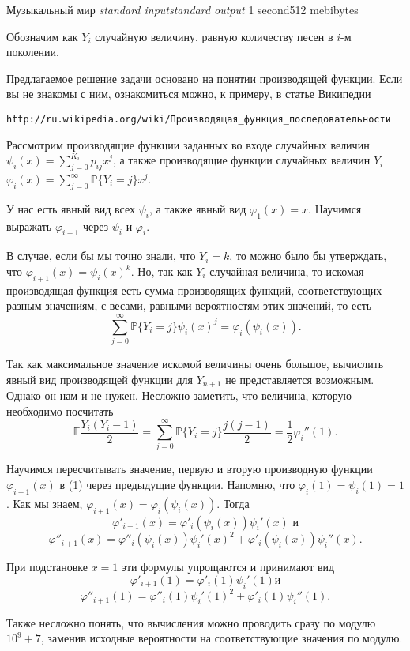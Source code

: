 \begin{problem}{Музыкальный мир}
{\textsl{standard input}}{\textsl{standard output}}
{1 second}{512 mebibytes}{}

Обозначим как $Y_i$ случайную величину,
равную количеству песен в $i$-м поколении.

Предлагаемое решение задачи основано на понятии производящей функции.
Если вы не знакомы с ним, ознакомиться можно, к примеру, в статье Википедии

\verb+http://ru.wikipedia.org/wiki/Производящая_функция_последовательности+

Рассмотрим производящие функции заданных во входе случайных величин
$\psi_i(x) = \sum\limits_{j=0}^{K_i}{p_{ij}x^j}$,
а также производящие функции случайных величин $Y_i$
$\varphi_i(x) = \sum\limits_{j=0}^{\infty}{\mathbb{P}\{Y_i=j\}x^j}$.

У нас есть явный вид всех $\psi_i$, а также явный вид $\varphi_1(x) = x$.
Научимся выражать $\varphi_{i+1}$ через $\psi_{i}$ и $\varphi_{i}$.

В случае, если бы мы точно знали, что $Y_i = k$,
то можно было бы утверждать, что $\varphi_{i+1}(x) = \psi_i(x)^k$.
Но, так как $Y_i$ случайная величина, то искомая производящая функция
есть сумма производящих функций, соответствующих разным значениям,
с весами, равными вероятностям этих значений, то есть
$$\sum\limits_{j=0}^{\infty}{\mathbb{P}\{Y_i=j\}\psi_i(x)^j} =
\varphi_i(\psi_i(x))\text{.}$$

Так как максимальное значение искомой величины очень большое,
вычислить явный вид производящей функции для $Y_{n+1}$
не представляется возможным. 
Однако он нам и не нужен.
Несложно заметить, что величина, которую необходимо посчитать
$$\mathbb{E}\frac{Y_i(Y_i-1)}{2} =
\sum\limits_{j=0}^{\infty}{\mathbb{P}\{Y_i=j\}\frac{j(j-1)}{2}} =
\frac{1}{2}\varphi_i''(1)\text{.}$$

Научимся пересчитывать значение, первую и вторую производную функции
$\varphi_{i+1}(x)$ в (1) через предыдущие функции.
Напомню, что $\varphi_i(1) = \psi_i(1) = 1$.
Как мы знаем, $\varphi_{i+1}(x) = \varphi_i(\psi_i(x))$.
Тогда $$\varphi'_{i+1}(x) = \varphi'_{i}(\psi_i(x))\psi_{i}'(x) \text{ и}$$
$$\varphi''_{i+1}(x) = \varphi''_{i}(\psi_i(x))\psi_{i}'(x)^2 +
\varphi'_{i}(\psi_i(x))\psi_{i}''(x)\text{.}$$

При подстановке $x = 1$ эти формулы упрощаются и принимают вид
$$\varphi'_{i+1}(1) = \varphi'_{i}(1)\psi_{i}'(1) \text{и}$$
$$\varphi''_{i+1}(1) = \varphi''_{i}(1)\psi_{i}'(1)^2 +
\varphi'_{i}(1)\psi_{i}''(1)\text{.}$$

Также несложно понять, что вычисления можно проводить сразу по модулю $10^9+7$,
заменив исходные вероятности на соответствующие значения по модулю.

\end{problem}

